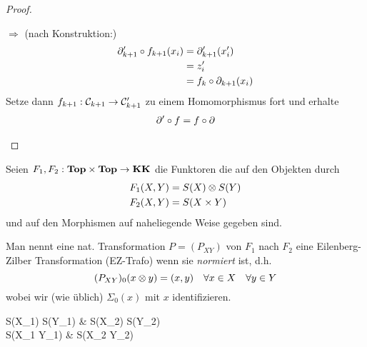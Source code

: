 \begin{proof}
\begin{enumerate}
\begin{itemize}
			$\Rightarrow$ (nach Konstruktion:)
			\begin{align*}
				\partial'_{k+1} \circ f_{k+1}(x_i) &= \partial'_{k+1} (x'_i) \\
				  &= z'_i \\
				  &= f_k \circ \partial_{k+1} (x_i)
			\end{align*}
			Setze dann $f_{k+1} : \mathcal{C}_{k+1} \rightarrow \mathcal{C}'_{k+1}$ zu einem Homomorphismus fort und erhalte
			\begin{align*}
				\partial' \circ f = f \circ \partial
			\end{align*}
		\end{itemize}
	\end{enumerate}
\end{proof}

\begin{defn}
	Seien $F_1,F_2 : \mathbf{Top} \times \mathbf{Top} \rightarrow \mathbf{KK}$ die Funktoren die auf den Objekten durch
	\begin{align*}
		F_1(X,Y) &= S(X) \otimes S(Y) \\
		F_2(X,Y) &= S(X \times Y)
	\end{align*}
	und auf den Morphismen auf naheliegende Weise gegeben sind.
	
	Man nennt eine nat. Transformation $P = (P_{XY})$ von $F_1$ nach $F_2$ eine Eilenberg-Zilber Transformation (EZ-Trafo) wenn sie \emph{normiert} ist, d.h.
	\begin{equation*}
		(P_{XY})_0(x \otimes y) = (x,y) \quad \forall x \in X \quad \forall y \in Y
	\end{equation*}
	wobei wir (wie üblich) $\Sigma_0 (x)$ mit $x$ identifizieren.
	
	\begin{center}
	\begin{cd}
		S(X_1) \tensor S(Y_1) \ar[r, "S_f \tensor S_g"] \ar[d, "P_{X_1Y_1}", swap] & S(X_2) \tensor S(Y_2) \ar[d, "P_{X_2Y_2}"] \\
		S(X_1 \times Y_1)  & S(X_2 \times Y_2)
	\end{cd}
	\end{center}
\end{defn}

